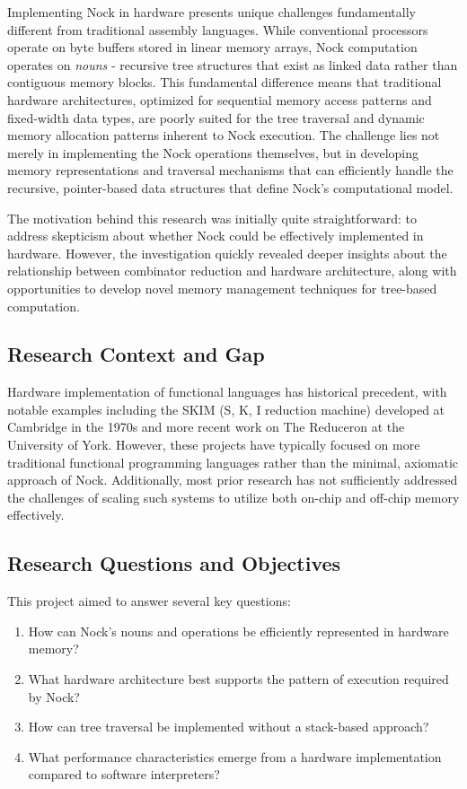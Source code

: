 \documentclass[twoside]{article}
\begin{document}
Implementing Nock in hardware presents unique challenges fundamentally different from traditional assembly languages. While conventional processors operate on byte buffers stored in linear memory arrays, Nock computation operates on \textit{nouns} - recursive tree structures that exist as linked data rather than contiguous memory blocks. This fundamental difference means that traditional hardware architectures, optimized for sequential memory access patterns and fixed-width data types, are poorly suited for the tree traversal and dynamic memory allocation patterns inherent to Nock execution. The challenge lies not merely in implementing the Nock operations themselves, but in developing memory representations and traversal mechanisms that can efficiently handle the recursive, pointer-based data structures that define Nock's computational model.

The motivation behind this research was initially quite straightforward: to address skepticism about whether Nock could be effectively implemented in hardware. However, the investigation quickly revealed deeper insights about the relationship between combinator reduction and hardware architecture, along with opportunities to develop novel memory management techniques for tree-based computation.

\subsection{Research Context and Gap}

Hardware implementation of functional languages has historical precedent, with notable examples including the SKIM (S, K, I reduction machine) developed at Cambridge in the 1970s and more recent work on The Reduceron at the University of York. However, these projects have typically focused on more traditional functional programming languages rather than the minimal, axiomatic approach of Nock. Additionally, most prior research has not sufficiently addressed the challenges of scaling such systems to utilize both on-chip and off-chip memory effectively.

\subsection{Research Questions and Objectives}

This project aimed to answer several key questions:

\begin{enumerate}
  \item How can Nock's nouns and operations be efficiently represented in hardware memory?
  \item What hardware architecture best supports the pattern of execution required by Nock?
  \item How can tree traversal be implemented without a stack-based approach?
  \item What performance characteristics emerge from a hardware implementation compared to software interpreters?
\end{enumerate}
\end{document}
